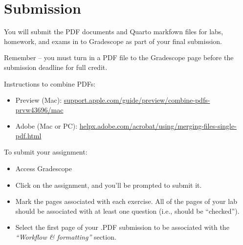 \documentclass[
  letterpaper,
  DIV=11,
  numbers=noendperiod]{scrartcl}
\begin{document}
\section{Submission}\label{submission}

You will submit the PDF documents and Quarto markfown files for labs,
homework, and exams in to Gradescope as part of your final submission.

\begin{tcolorbox}[enhanced jigsaw, leftrule=.75mm, colback=white, toptitle=1mm, bottomtitle=1mm, colbacktitle=quarto-callout-warning-color!10!white, titlerule=0mm, bottomrule=.15mm, breakable, rightrule=.15mm, left=2mm, title=\textcolor{quarto-callout-warning-color}{\faExclamationTriangle}\hspace{0.5em}{Warning}, toprule=.15mm, opacityback=0, opacitybacktitle=0.6, arc=.35mm, coltitle=black, colframe=quarto-callout-warning-color-frame]

Remember -- you must turn in a PDF file to the Gradescope page before
the submission deadline for full credit.

Instructions to combine PDFs:

\begin{itemize}
\item
  Preview (Mac):
  \href{https://support.apple.com/guide/preview/combine-pdfs-prvw43696/mac}{support.apple.com/guide/preview/combine-pdfs-prvw43696/mac}
\item
  Adobe (Mac or PC):
  \href{https://helpx.adobe.com/acrobat/using/merging-files-single-pdf.html}{helpx.adobe.com/acrobat/using/merging-files-single-pdf.html}
\end{itemize}

\end{tcolorbox}

To submit your assignment:

\begin{itemize}
\item
  Access Gradescope
\item
  Click on the assignment, and you'll be prompted to submit it.
\item
  Mark the pages associated with each exercise. All of the pages of your
  lab should be associated with at least one question (i.e., should be
  ``checked'').
\item
  Select the first page of your .PDF submission to be associated with
  the \emph{``Workflow \& formatting''} section.
\end{itemize}
\end{document}
